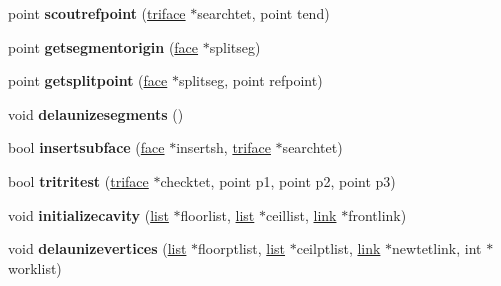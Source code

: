 \begin{DoxyCompactItemize}
point {\bfseries scoutrefpoint} (\hyperlink{classStemMesh3D_1_1tetgenmesh_1_1triface}{triface} $\ast$searchtet, point tend)
\item 
\mbox{\label{classStemMesh3D_1_1tetgenmesh_abc8ddf694d432148026bbb4f0683efda}} 
point {\bfseries getsegmentorigin} (\hyperlink{classStemMesh3D_1_1tetgenmesh_1_1face}{face} $\ast$splitseg)
\item 
\mbox{\label{classStemMesh3D_1_1tetgenmesh_af867e46a810d4e8e94c3bb54ecafe218}} 
point {\bfseries getsplitpoint} (\hyperlink{classStemMesh3D_1_1tetgenmesh_1_1face}{face} $\ast$splitseg, point refpoint)
\item 
\mbox{\label{classStemMesh3D_1_1tetgenmesh_a429e038764e179aba1281c82ff4733a6}} 
void {\bfseries delaunizesegments} ()
\item 
\mbox{\label{classStemMesh3D_1_1tetgenmesh_acac8e86c4cc6e7c041e1afc1cea2a13a}} 
bool {\bfseries insertsubface} (\hyperlink{classStemMesh3D_1_1tetgenmesh_1_1face}{face} $\ast$insertsh, \hyperlink{classStemMesh3D_1_1tetgenmesh_1_1triface}{triface} $\ast$searchtet)
\item 
\mbox{\label{classStemMesh3D_1_1tetgenmesh_acb5733bfda33928379b12ae4dacbc098}} 
bool {\bfseries tritritest} (\hyperlink{classStemMesh3D_1_1tetgenmesh_1_1triface}{triface} $\ast$checktet, point p1, point p2, point p3)
\item 
\mbox{\label{classStemMesh3D_1_1tetgenmesh_a90bdd1ecc308a125b32124e3dddfe06d}} 
void {\bfseries initializecavity} (\hyperlink{classStemMesh3D_1_1tetgenmesh_1_1list}{list} $\ast$floorlist, \hyperlink{classStemMesh3D_1_1tetgenmesh_1_1list}{list} $\ast$ceillist, \hyperlink{classStemMesh3D_1_1tetgenmesh_1_1link}{link} $\ast$frontlink)
\item 
\mbox{\label{classStemMesh3D_1_1tetgenmesh_a60a3195325f0e6d0253b64891562b967}} 
void {\bfseries delaunizevertices} (\hyperlink{classStemMesh3D_1_1tetgenmesh_1_1list}{list} $\ast$floorptlist, \hyperlink{classStemMesh3D_1_1tetgenmesh_1_1list}{list} $\ast$ceilptlist, \hyperlink{classStemMesh3D_1_1tetgenmesh_1_1link}{link} $\ast$newtetlink, int $\ast$worklist)

\end{DoxyCompactItemize}
